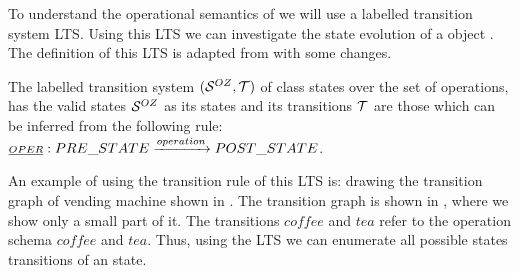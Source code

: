 To understand the operational semantics of \oz{} we will use  a labelled transition system LTS. Using this LTS we can investigate the state evolution of a \oz{} object . The definition of this LTS is adapted from  with some changes.

\begin{definition}[LTS of \oz{}]
\label{def_oz_trans_system}
The labelled transition system $(\stats,\traces)$ of \oz{} class states over the set of operations, has the valid states $\mathcal S^{OZ}$ as its states and its transitions $\traces$ are those which can be inferred from the following rule: \\$\underline{\scriptstyle{OPER}}: PRE\_STATE \xrightarrow{operation} POST\_STATE$.
\end{definition}
An example of using the transition rule of this LTS is: drawing the transition graph of vending machine shown in  . The transition graph is shown in , where we show only a small part of it. The transitions $coffee$ and $tea$ refer to the operation schema $coffee$ and $tea$. Thus, using the LTS we can enumerate all possible states transitions of an \oz{} state.



